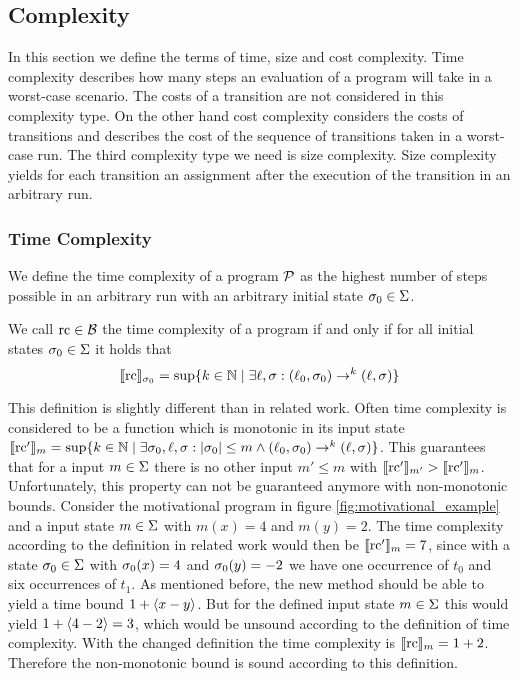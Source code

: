 \subsection{Complexity}

In this section we define the terms of time, size and cost complexity.
Time complexity describes how many steps an evaluation of a program will take in a worst-case scenario.
The costs of a transition are not considered in this complexity type.
On the other hand cost complexity considers the costs of transitions and describes the cost of the sequence of transitions taken in a worst-case run.
The third complexity type we need is size complexity.
Size complexity yields for each transition an assignment  after the execution of the transition in an arbitrary run.

\subsubsection{Time Complexity}

We define the time complexity of a program $\mathcal{P}$ as the highest number of steps possible in an arbitrary run with an arbitrary initial state $\sigma_0 \in \Sigma$.

\begin{definition}
  We call $\text{rc} \in \mathcal{B}$ the time complexity of a program if and only if for all initial states $\sigma_0 \in \Sigma$ it holds that
  \[ \llbracket \text{rc} \rrbracket_{\sigma_0} = \sup \lbrace  k \in \mathbb{N} \mid \exists \ell, \sigma: (\ell_0, \sigma_0) \rightarrow^k (\ell, \sigma)  \rbrace \]
\end{definition}

This definition is slightly different than in related work. 
Often time complexity is considered to be a function which is monotonic in its input state $\llbracket \text{rc}' \rrbracket_{m} = \sup \lbrace  k \in \mathbb{N} \mid \exists \sigma_0, \ell, \sigma: \left|\sigma_0\right| \leq m \wedge (\ell_0, \sigma_0) \rightarrow^k (\ell, \sigma)  \rbrace$.
This guarantees that for a input $m \in \Sigma$ there is no other input $m' \leq m$ with $\llbracket \text{rc}' \rrbracket_{m'} > \llbracket \text{rc}' \rrbracket_{m}$.
Unfortunately, this property can not be guaranteed anymore with non-monotonic bounds.
Consider the motivational program in figure \ref{fig:motivational_example} and a input state $m \in \Sigma$ with $m(x) = 4$ and $m(y) = 2$.
The time complexity according to the definition in related work would then be $\llbracket \text{rc}' \rrbracket_{m} = 7$, since with a state $\sigma_0 \in \Sigma$ with $\sigma_0(x) = 4$ and $\sigma_0(y) = -2$ we have one occurrence of $t_0$ and six occurrences of $t_1$.
As mentioned before, the new method should be able to yield a time bound $1 + \langle x-y\rangle$.
But for the defined input state $m \in \Sigma$ this would yield $1 + \langle4-2\rangle = 3$, which would be unsound according to the definition of time complexity.
With the changed definition the time complexity is $\llbracket \text{rc} \rrbracket_{m} = 1 + 2$.
Therefore the non-monotonic bound is sound according to this definition.

